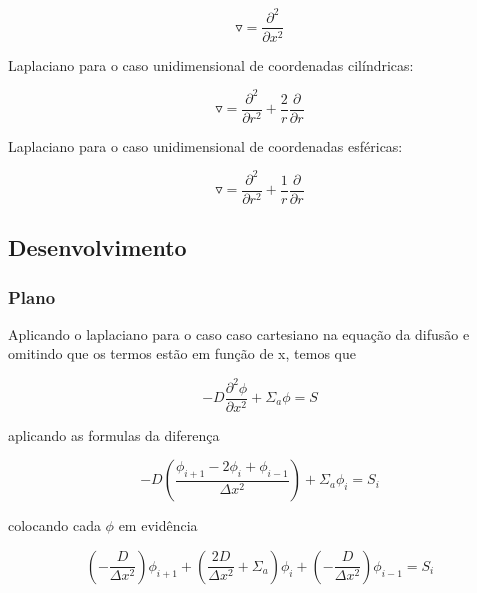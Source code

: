 \documentclass{article}
\begin{document}
            \begin{equation}
                \triangledown =  \frac{\partial^2}{\partial x^2} 
            \end{equation}
            
            Laplaciano para o caso unidimensional de coordenadas cilíndricas:
        
            \begin{equation}
                \triangledown =  \frac{\partial^2}{\partial r^2}  + \frac{2}{r} \frac{\partial}{\partial r}
            \end{equation}
           
            Laplaciano para o caso unidimensional de coordenadas esféricas:

            \begin{equation}
                \triangledown =  \frac{\partial^2}{\partial r^2}  + \frac{1}{r} \frac{\partial}{\partial r}
            \end{equation}
            
        \subsection{Desenvolvimento}

            \subsubsection{Plano}
    
                Aplicando o laplaciano para o caso caso cartesiano na equação da difusão e omitindo que os termos estão em função de x, temos que
                
                \begin{equation}
                    -D \frac{\partial^2\phi}{\partial x^2} + \Sigma_a \phi = S
                \end{equation}
        
                aplicando as formulas da diferença
        
                \begin{equation}
                    -D ( \frac{\phi_{i+1} - 2\phi_i + \phi_{i-1}}{\Delta x^2}  ) + \Sigma_a \phi_i = S_i
                \end{equation}
    
                colocando cada $\phi$ em evidência
                
                \begin{equation}
                    ( -\frac{D}{\Delta x^2} ) \phi_{i+1}    +    (\frac{2D}{\Delta x^2} + \Sigma_a) \phi_i    +    (-\frac{D}{\Delta x^2} ) \phi_{i-1} = S_i
                \end{equation}
    
\end{document}
